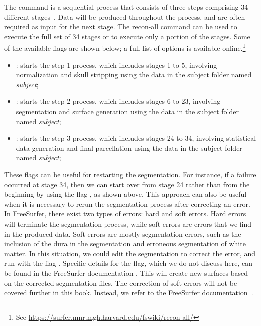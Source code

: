 The command  is a sequential process that consists of
three steps comprising 34 different
stages~\cite{freesurfer-wiki}. Data will be produced throughout the
process, and are often required as input for the next stage. The
recon-all command can be used to execute the full set of 34 stages or
to execute only a portion of the stages. Some of the available
 flags are shown below; a full list of options is
available online.\footnote{See
  \url{https://surfer.nmr.mgh.harvard.edu/fswiki/recon-all/}}
\begin{itemize}
\item {}: starts the step-1 process, which includes stages 1 to 5, involving normalization and skull stripping using the data in the subject folder named \textit{subject}; 
\item {}: starts the step-2 process, which includes stages 6 to 23, involving segmentation and surface generation using the data in the subject folder named \textit{subject};
\item {}: starts the step-3 process, which includes stages 24 to 34, involving statistical data generation and final parcellation using the data in the subject folder named \textit{subject};
\end{itemize} 

These flags can be useful for restarting the segmentation. For
instance, if a failure occurred at stage 34, then we can start over
from stage 24 rather than from the beginning by using the flag
, as shown above. This approach can also be useful
when it is necessary to rerun the segmentation process after
correcting an error. In FreeSurfer, there exist two types of errors:
hard and soft errors. Hard errors will terminate the segmentation
process, while soft errors are errors that we find in the produced
data. Soft errors are mostly segmentation errors, such as the
inclusion of the dura in the segmentation and erroneous segmentation
of white matter. In this situation, we could edit the segmentation to
correct the error, and run  with the flag
. Specific details for the
 flag, which we do not discuss here, can be
found in the FreeSurfer documentation \cite{freesurfer-wiki}. This
will create new surfaces based on the corrected segmentation
files. The correction of soft errors will not be covered further in
this book. Instead, we refer to the FreeSurfer
documentation~\cite{freesurfer-wiki}.

